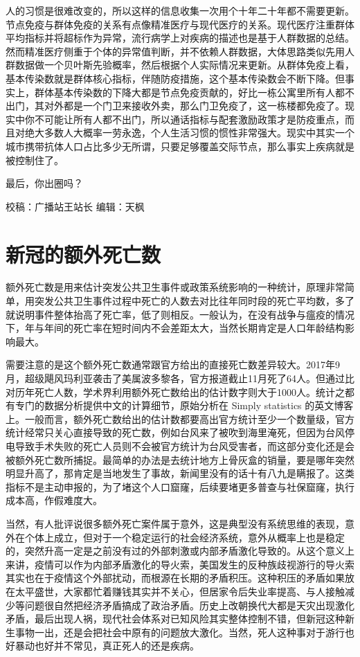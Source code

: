 \documentclass[
]{book}
\begin{document}
人的习惯是很难改变的，所以这样的信息收集一次用个十年二十年都不需要更新。节点免疫与群体免疫的关系有点像精准医疗与现代医疗的关系。现代医疗注重群体平均指标并将超标作为异常，流行病学上对疾病的描述也是基于人群数据的总结。然而精准医疗侧重于个体的异常值判断，并不依赖人群数据，大体思路类似先用人群数据做一个贝叶斯先验概率，然后根据个人实际情况来更新。从群体免疫上看，基本传染数就是群体核心指标，伴随防疫措施，这个基本传染数会不断下降。但事实上，群体基本传染数的下降大都是节点免疫贡献的，好比一栋公寓里所有人都不出门，其对外都是一个门卫来接收外卖，那么门卫免疫了，这一栋楼都免疫了。现实中你不可能让所有人都不出门，所以通话指标与配套激励政策才是防疫重点，而且对绝大多数人大概率一劳永逸，个人生活习惯的惯性非常强大。现实中其实一个城市携带抗体人口占比多少无所谓，只要足够覆盖交际节点，那么事实上疾病就是被控制住了。

最后，你出圈吗？

校稿：广播站王站长
编辑：天枫

\hypertarget{ux65b0ux51a0ux7684ux989dux5916ux6b7bux4ea1ux6570}{%
\section{新冠的额外死亡数}\label{ux65b0ux51a0ux7684ux989dux5916ux6b7bux4ea1ux6570}}

额外死亡数是用来估计突发公共卫生事件或政策系统影响的一种统计，原理非常简单，用突发公共卫生事件过程中死亡的人数去对比往年同时段的死亡平均数，多了就说明事件整体抬高了死亡率，低了则相反。一般认为，在没有战争与瘟疫的情况下，年与年间的死亡率在短时间内不会差距太大，当然长期肯定是人口年龄结构影响最大。

需要注意的是这个额外死亡数通常跟官方给出的直接死亡数差异较大。2017年9月，超级飓风玛利亚袭击了美属波多黎各，官方报道截止11月死了64人。但通过比对历年死亡人数，学术界利用额外死亡数给出的估计数字则大于1000人。统计之都有专门的数据分析提供中文的计算细节，原始分析在 Simply statistics 的英文博客上。一般而言，额外死亡数给出的估计数都要高出官方统计至少一个数量级，官方统计经常只关心直接导致的死亡数，例如台风来了被吹到海里淹死，但因为台风停电导致手术失败的死亡人员则不会被官方统计为台风受害者，而这部分变化还是会被额外死亡数所捕捉。最简单的办法是去统计地方上骨灰盒的销量，要是哪年突然明显升高了，那肯定是当地发生了事故，新闻里没有的话十有八九是瞒报了。这类指标不是主动申报的，为了堵这个人口窟窿，后续要堵更多普查与社保窟窿，执行成本高，作假难度大。

当然，有人批评说很多额外死亡案件属于意外，这是典型没有系统思维的表现，意外在个体上成立，但对于一个稳定运行的社会经济系统，意外从概率上也是稳定的，突然升高一定是之前没有过的外部刺激或内部矛盾激化导致的。从这个意义上来讲，疫情可以作为内部矛盾激化的导火索，美国发生的反种族歧视游行的导火索其实也在于疫情这个外部扰动，而根源在长期的矛盾积压。这种积压的矛盾如果放在太平盛世，大家都忙着赚钱其实并不关心，但居家令后失业率提高、与人接触减少等问题很自然把经济矛盾搞成了政治矛盾。历史上改朝换代大都是天灾出现激化矛盾，最后出现人祸，现代社会体系对已知风险其实整体控制不错，但新冠这种新生事物一出，还是会把社会中原有的问题放大激化。当然，死人这种事对于游行也好暴动也好并不常见，真正死人的还是疾病。
\end{document}
